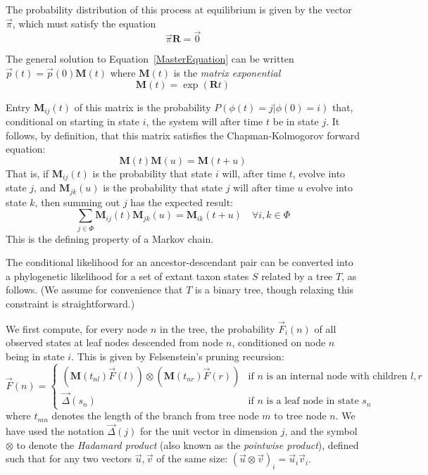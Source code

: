 \documentclass{bmcart}
\newcommand{\matr}[1]{\mathbf{#1}}
\newcommand{\eqref}[1]{Equation~\ref{#1}}
\newcommand{\statespace}{\Phi}
\newcommand{\state}{\phi}
\newcommand{\statevec}{\vec{p}}
\newcommand{\ratematrix}{\matr{R}}
\newcommand{\eqmvec}{\vec{\pi}}
\newcommand{\condmatrix}{\matr{M}}
\newcommand{\felsvec}{\vec{F}}
\newcommand{\unitvec}{\vec{\Delta}}
\newcommand{\pointprod}{\otimes}
\begin{document}
The probability distribution of this process at equilibrium is given by the vector $\eqmvec$,
which must satisfy the equation
\[
\eqmvec \ratematrix = \vec{0}
\]

The general solution to \eqref{MasterEquation} can be
written $\statevec(t) = \statevec(0) \condmatrix(t)$
where $\condmatrix(t)$ is the {\em matrix exponential}
\begin{equation}
\condmatrix(t) = \exp ( \ratematrix t )
\label{MatrixExponential}
\end{equation}

Entry $\condmatrix_{ij}(t)$ of this matrix is the probability
$P(\state(t)=j|\state(0)=i)$
that, conditional on starting in state $i$,
the system will after time $t$ be in state $j$.
It follows, by definition, that this matrix satisfies the
Chapman-Kolmogorov forward equation:
\begin{equation}
\condmatrix(t) \condmatrix(u) = \condmatrix(t+u)
\label{ChapmanKolmogorov}
\end{equation}
That is, if $\condmatrix_{ij}(t)$ is the probability
that state $i$ will, after time $t$, evolve into state $j$,
and $\condmatrix_{jk}(u)$ is the probability that state $j$ will after time $u$ evolve into state $k$,
then summing out $j$ has the expected result:
\[
\sum_{j \in \statespace} \condmatrix_{ij}(t) \condmatrix_{jk}(u) = \condmatrix_{ik}(t+u)
\quad \forall i,k \in \statespace
\]
This is the defining property of a Markov chain.

The conditional likelihood for an ancestor-descendant pair can be converted
into a phylogenetic likelihood for a set of extant taxon states $S$ related by a tree $T$,
as follows.
(We assume for convenience that $T$ is a binary tree, though relaxing this constraint is straightforward.)

We first compute, for every node $n$ in the tree,
the probability $\felsvec_i(n)$
of all observed states at leaf nodes descended from node $n$,
conditioned on node $n$ being in state $i$.
This is given by Felsenstein's pruning recursion:
\begin{equation}
\felsvec(n) = \left\{
\begin{array}{ll}
\displaystyle
\left( \condmatrix(t_{nl}) \felsvec(l) \right)
\pointprod
\left( \condmatrix(t_{nr}) \felsvec(r) \right)
& \mbox{if $n$ is an internal node with children $l,r$} \\
\displaystyle
\vec{\Delta}(s_n)
& \mbox{if $n$ is a leaf node in state $s_n$}
\end{array}
\right.
\label{Felsenstein}
\end{equation}
where $t_{mn}$ denotes the length of the branch from tree node $m$ to tree node $n$.
We have used the notation
$\unitvec(j)$ for the unit vector in dimension $j$,
and the symbol
$\pointprod$ to denote the {\em Hadamard product} (also known as the {\em pointwise product}),
defined such that for any two vectors $\vec{u},\vec{v}$ of the same size:
$(\vec{u} \pointprod \vec{v})_i = \vec{u}_i \vec{v}_i$.
\end{document}
